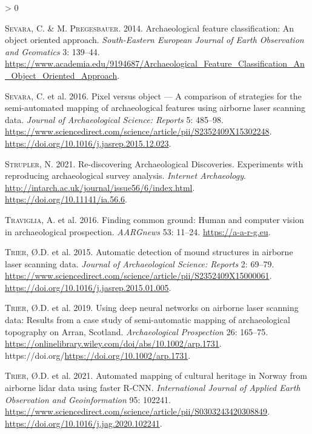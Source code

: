 \documentclass[
  12pt,
]{article}
\newlength{\cslhangindent}
\newenvironment{CSLReferences}[2] %
 {%
  \setlength{\parindent}{0pt}
  \ifodd #1 \everypar{\setlength{\hangindent}{\cslhangindent}}\ignorespaces\fi
  \ifnum #2 > 0
  \setlength{\parskip}{#2\baselineskip}
  \fi
 }%
 {}
\begin{document}
\begin{CSLReferences}{1}{0}
\leavevmode\hypertarget{ref-sevaraArchaeologicalFeatureClassification2014a}{}%
\textsc{Sevara}, C. \& M. \textsc{Pregesbauer}. 2014. Archaeological feature classification: {An} object oriented approach. \emph{South-Eastern European Journal of Earth Observation and Geomatics} 3: 139--44. \url{https://www.academia.edu/9194687/Archaeological_Feature_Classification_An_Object_Oriented_Approach}.

\leavevmode\hypertarget{ref-sevaraPixelObjectComparison2016a}{}%
\textsc{Sevara}, C. et al. 2016. Pixel versus object --- {A} comparison of strategies for the semi-automated mapping of archaeological features using airborne laser scanning data. \emph{Journal of Archaeological Science: Reports} 5: 485--98. \url{https://www.sciencedirect.com/science/article/pii/S2352409X15302248}. \url{https://doi.org/10.1016/j.jasrep.2015.12.023}.

\leavevmode\hypertarget{ref-struplerRediscoveringArchaeologicalDiscoveries2021}{}%
\textsc{Strupler}, N. 2021. Re-discovering {Archaeological} {Discoveries}. {Experiments} with reproducing archaeological survey analysis. \emph{Internet Archaeology}. \url{http://intarch.ac.uk/journal/issue56/6/index.html}. \url{https://doi.org/10.11141/ia.56.6}.

\leavevmode\hypertarget{ref-travigliaFindingCommonGround2016a}{}%
\textsc{Traviglia}, A. et al. 2016. Finding common ground: Human and computer vision in archaeological prospection. \emph{AARGnews} 53: 11--24. \url{https://a-a-r-g.eu}.

\leavevmode\hypertarget{ref-trierAutomaticDetectionMound2015a}{}%
\textsc{Trier}, Ø.D. et al. 2015. Automatic detection of mound structures in airborne laser scanning data. \emph{Journal of Archaeological Science: Reports} 2: 69--79. \url{https://www.sciencedirect.com/science/article/pii/S2352409X15000061}. \url{https://doi.org/10.1016/j.jasrep.2015.01.005}.

\leavevmode\hypertarget{ref-trierUsingDeepNeural2019a}{}%
\textsc{Trier}, Ø.D. et al. 2019. Using deep neural networks on airborne laser scanning data: {Results} from a case study of semi-automatic mapping of archaeological topography on {Arran}, {Scotland}. \emph{Archaeological Prospection} 26: 165--75. \url{https://onlinelibrary.wiley.com/doi/abs/10.1002/arp.1731}. https://doi.org/\url{https://doi.org/10.1002/arp.1731}.

\leavevmode\hypertarget{ref-trierAutomatedMappingCultural2021a}{}%
\textsc{Trier}, Ø.D. et al. 2021. Automated mapping of cultural heritage in {Norway} from airborne lidar data using faster {R}-{CNN}. \emph{International Journal of Applied Earth Observation and Geoinformation} 95: 102241. \url{https://www.sciencedirect.com/science/article/pii/S0303243420308849}. \url{https://doi.org/10.1016/j.jag.2020.102241}.


\end{CSLReferences}
\end{document}
